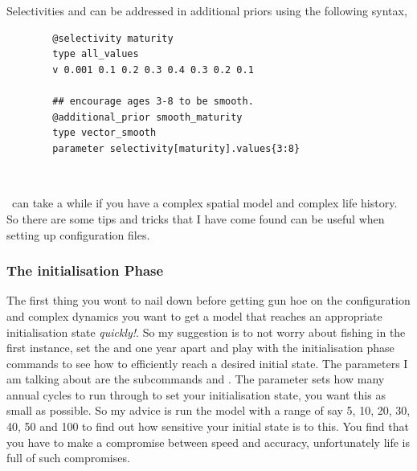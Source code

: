 %
%


Selectivities  and  can be addressed in additional priors using the following syntax,

{\small{\begin{verbatim}
		@selectivity maturity
		type all_values
		v 0.001 0.1 0.2 0.3 0.4 0.3 0.2 0.1
		
		## encourage ages 3-8 to be smooth.
		@additional_prior smooth_maturity
		type vector_smooth
		parameter selectivity[maturity].values{3:8}
		
		\end{verbatim}}}
	
	
\subsection{\label{sec:tips}}
\IBM\ can take a while if you have a complex spatial model and complex life history. So there are some tips and tricks that I have come found can be useful when setting up configuration files.

\subsubsection*{The initialisation Phase}
The first thing you wont to nail down before getting gun hoe on the configuration and complex dynamics you want to get a model that reaches an appropriate initialisation state \emph{quickly!}. So my suggestion is to not worry about fishing in the first instance, set the  and  one year apart and play with the initialisation phase commands to see how to efficiently reach a desired initial state. The parameters I am talking about are the subcommands  and . The  parameter sets how many annual cycles to run through to set your initialisation state, you want this as small as possible. So my advice is run the model with a range of  say 5, 10, 20, 30, 40, 50 and 100 to find out how sensitive your initial state is to this. You find that you have to make a compromise between speed and accuracy, unfortunately life is full of such compromises.

